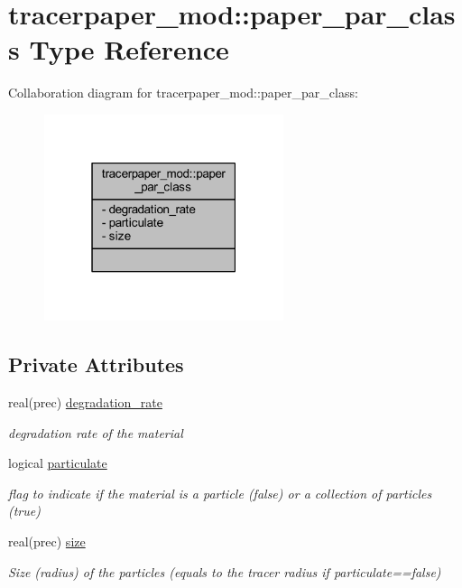 \hypertarget{structtracerpaper__mod_1_1paper__par__class}{}\section{tracerpaper\+\_\+mod\+:\+:paper\+\_\+par\+\_\+class Type Reference}
\label{structtracerpaper__mod_1_1paper__par__class}


Collaboration diagram for tracerpaper\+\_\+mod\+:\+:paper\+\_\+par\+\_\+class\+:\nopagebreak
\begin{figure}[H]
\begin{center}
\leavevmode
\includegraphics[width=199pt]{structtracerpaper__mod_1_1paper__par__class__coll__graph}
\end{center}
\end{figure}
\subsection*{Private Attributes}
\begin{DoxyCompactItemize}
\item 
real(prec) \mbox{\hyperlink{structtracerpaper__mod_1_1paper__par__class_a62cc56ab7188369a98711e6f6c5001de}{degradation\+\_\+rate}}
\begin{DoxyCompactList}\small\item\em degradation rate of the material \end{DoxyCompactList}\item 
logical \mbox{\hyperlink{structtracerpaper__mod_1_1paper__par__class_a3b237f726cdf3f35fa122047d0175351}{particulate}}
\begin{DoxyCompactList}\small\item\em flag to indicate if the material is a particle (false) or a collection of particles (true) \end{DoxyCompactList}\item 
real(prec) \mbox{\hyperlink{structtracerpaper__mod_1_1paper__par__class_a25325a2f6e0e3a16e1a2abffe5d0f6c8}{size}}
\begin{DoxyCompactList}\small\item\em Size (radius) of the particles (equals to the tracer radius if particulate==false) \end{DoxyCompactList}\end{DoxyCompactItemize}


